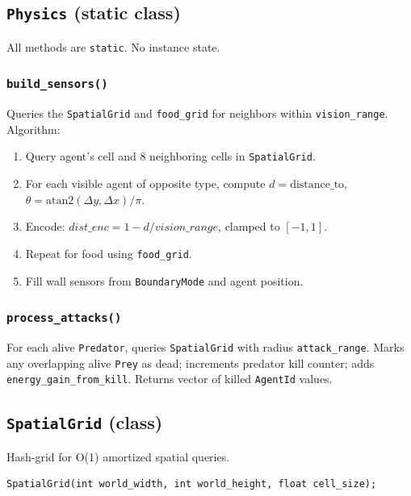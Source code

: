 \subsection{\texttt{Physics} (static class)}

All methods are \texttt{static}.  No instance state.

\subsubsection{\texttt{build\_sensors()}}

Queries the \texttt{SpatialGrid} and \texttt{food\_grid} for neighbors within
\texttt{vision\_range}.  Algorithm:
\begin{enumerate}[nosep]
  \item Query agent's cell and 8 neighboring cells in \texttt{SpatialGrid}.
  \item For each visible agent of opposite type, compute
    $d = \text{distance\_to}$, $\theta = \text{atan2}(\Delta y,\Delta x)/\pi$.
  \item Encode: $\mathit{dist\_enc} = 1 - d/\mathit{vision\_range}$, clamped to $[-1,1]$.
  \item Repeat for food using \texttt{food\_grid}.
  \item Fill wall sensors from \texttt{BoundaryMode} and agent position.
\end{enumerate}

\subsubsection{\texttt{process\_attacks()}}

For each alive \texttt{Predator}, queries \texttt{SpatialGrid} with radius
\texttt{attack\_range}.  Marks any overlapping alive \texttt{Prey} as dead;
increments predator kill counter; adds \texttt{energy\_gain\_from\_kill}.
Returns vector of killed \texttt{AgentId} values.

\subsection{\texttt{SpatialGrid} (class)}

Hash-grid for O(1) amortized spatial queries.

\begin{lstlisting}
SpatialGrid(int world_width, int world_height, float cell_size);
\end{lstlisting}

